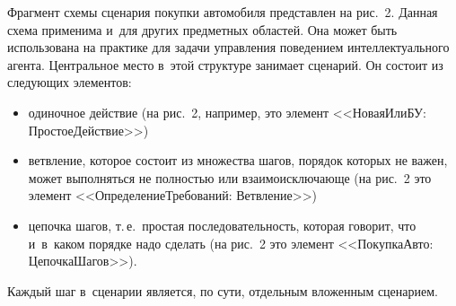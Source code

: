 \begin{multicols}{2}
  Фрагмент схемы сценария покупки автомобиля пред\-став\-лен на рис.~2. 
Данная схема применима и~для других пред\-мет\-ных областей. Она может быть 
использована на практике для задачи управ\-ле\-ния поведением 
интеллектуального агента. Центральное мес\-то в~этой структуре занимает 
сценарий. Он со\-сто\-ит из сле\-ду\-ющих элементов:
  \begin{itemize}
\item одиночное действие (на рис.~2, например, это элемент <<НоваяИлиБУ: 
ПростоеДействие>>)\\[-13pt]
\item ветвление, которое состоит из множества шагов, порядок которых не 
важен, может выполняться не полностью или вза\-и\-мо\-ис\-клю\-ча\-юще (на рис.~2 
это элемент <<ОпределениеТребований: Ветв\-ле\-ние>>)\\[-13pt]
\item цепочка шагов, т.\,е.\ прос\-тая последовательность, которая говорит, что 
и~в~каком порядке надо сделать (на рис.~2 это элемент <<ПокупкаАвто: 
ЦепочкаШагов>>).
\end{itemize}
  
  Каждый шаг в~сценарии является, по сути, отдельным вложенным сценарием.
  
  \pagebreak
  
  \end{multicols}

\begin{figure*} %
  \vspace*{1pt}
  \begin{center}  
    \mbox{%
\epsfxsize=163mm
}

\end{center}
\vspace*{-4pt}

\vspace*{-4pt}
\end{figure*}
  
